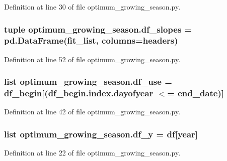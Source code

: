 Definition at line 30 of file optimum\+\_\+growing\+\_\+season.\+py.

\hypertarget{namespaceoptimum__growing__season_a7567df350b162f7d3d6181ea10f2552e}{}
\subsubsection[{df\+\_\+slopes}]{\setlength{\rightskip}{0pt plus 5cm}tuple optimum\+\_\+growing\+\_\+season.\+df\+\_\+slopes = pd.\+Data\+Frame({\bf fit\+\_\+list}, columns={\bf headers})}\label{namespaceoptimum__growing__season_a7567df350b162f7d3d6181ea10f2552e}


Definition at line 52 of file optimum\+\_\+growing\+\_\+season.\+py.

\hypertarget{namespaceoptimum__growing__season_a482c39a2eb8f7c0c781089e4e04cabc6}{}
\subsubsection[{df\+\_\+use}]{\setlength{\rightskip}{0pt plus 5cm}list optimum\+\_\+growing\+\_\+season.\+df\+\_\+use = {\bf df\+\_\+begin}\mbox{[}(df\+\_\+begin.\+index.\+dayofyear $<$= end\+\_\+date)\mbox{]}}\label{namespaceoptimum__growing__season_a482c39a2eb8f7c0c781089e4e04cabc6}


Definition at line 42 of file optimum\+\_\+growing\+\_\+season.\+py.

\hypertarget{namespaceoptimum__growing__season_a3a6ea20f80fd3051ababd80bd44be590}{}
\subsubsection[{df\+\_\+y}]{\setlength{\rightskip}{0pt plus 5cm}list optimum\+\_\+growing\+\_\+season.\+df\+\_\+y = {\bf df}\mbox{[}year\mbox{]}}\label{namespaceoptimum__growing__season_a3a6ea20f80fd3051ababd80bd44be590}


Definition at line 22 of file optimum\+\_\+growing\+\_\+season.\+py.

